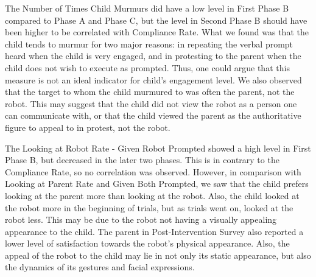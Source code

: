 The Number of Times Child Murmurs did have a low level in First Phase B compared to Phase A and Phase C, but the level in Second Phase B should have been higher to be correlated with Compliance Rate.  What we found was that the child tends to murmur for two major reasons: in repeating the verbal prompt heard when the child is very engaged, and in protesting to the parent when the child does not wish to execute as prompted.  Thus, one could argue that this measure is not an ideal indicator for child's engagement level.  We also observed that the target to whom the child murmured to was often the parent, not the robot.  This may suggest that the child did not view the robot as a person one can communicate with, or that the child viewed the parent as the authoritative figure to appeal to in protest, not the robot.

The Looking at Robot Rate - Given Robot Prompted showed a high level in First Phase B, but decreased in the later two phases.  This is in contrary to the Compliance Rate, so no correlation was observed.  However, in comparison with Looking at Parent Rate and Given Both Prompted, we saw that the child prefers looking at the parent more than looking at the robot.  Also, the child looked at the robot more in the beginning of trials, but as trials went on, looked at the robot less.  This may be due to the robot not having a visually appealing appearance to the child.  The parent in Post-Intervention Survey also reported a lower level of satisfaction towards the robot's physical appearance.  Also, the appeal of the robot to the child may lie in not only its static appearance, but also the dynamics of its gestures and facial expressions.

